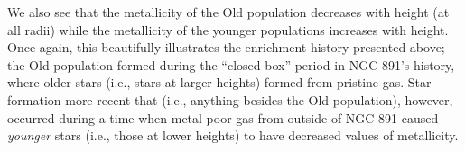We also see that the metallicity of the Old population decreases with
height (at all radii) while the metallicity of the younger populations
increases with height. Once again, this beautifully illustrates the
enrichment history presented above; the Old population formed during
the ``closed-box'' period in NGC 891's history, where older stars
(i.e., stars at larger heights) formed from pristine gas. Star
formation more recent that  (i.e., anything besides the
Old population), however, occurred during a time when metal-poor gas
from outside of NGC 891 caused \emph{younger} stars (i.e., those at
lower heights) to have decreased values of metallicity.



